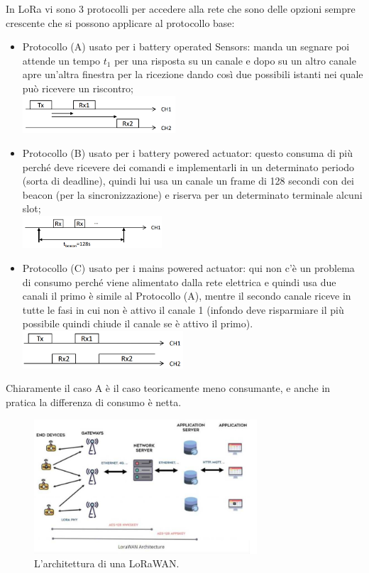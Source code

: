 \documentclass[11pt, twocolumn]{article}
\newenvironment{myitemize}
{ \begin{itemize}[topsep=0ex]
		\setlength{\itemsep}{0pt}
		\setlength{\parskip}{0pt}
		\setlength{\parsep}{0pt}     }
	{ \end{itemize}                  }
\begin{document}
In LoRa vi sono 3 protocolli per accedere alla rete che sono delle opzioni sempre crescente che si possono applicare al protocollo base:
\begin{myitemize} 
\item Protocollo (A) usato per i battery operated Sensors: manda un segnare poi attende un tempo $t_1$ per una risposta su un canale e dopo su un altro canale apre un'altra finestra per la ricezione dando così due possibili istanti nei quale può ricevere un riscontro;\\
\includegraphics[width=\linewidth,height=1.4cm]{imgs/loraMAC1.png}
\item Protocollo (B) usato per i battery powered actuator: questo consuma di più perché deve ricevere dei comandi e implementarli in un determinato periodo (sorta di deadline), quindi lui usa un canale un frame di 128 secondi con dei beacon (per la sincronizzazione) e riserva per un determinato terminale alcuni slot;\\
\includegraphics[width=\linewidth,height=1.2cm]{imgs/loraMAC2.png}
\item Protocollo (C) usato per i mains powered actuator: qui non c'è un problema di consumo perché viene alimentato dalla rete elettrica e quindi usa due canali il primo è simile al Protocollo (A), mentre il secondo canale riceve in tutte le fasi in cui non è attivo il canale 1 (infondo deve risparmiare il più possibile quindi chiude il canale se è attivo il primo).\\
\includegraphics[width=\linewidth,height=1.4cm]{imgs/loraMAC3.png}
\end{myitemize} 
Chiaramente il caso A è il caso teoricamente meno consumante, e anche in pratica la differenza di consumo è netta.\\
\begin{figure}[!h]
  \centering
  \includegraphics[width=\linewidth,height=5cm]{imgs/loraArch.jpg}
  \caption{L'architettura di una LoRaWAN.}
  \label{fig:loraArch}
\end{figure}\\
\end{document}
